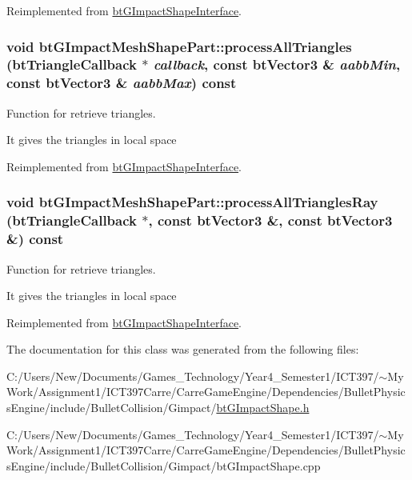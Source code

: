 Reimplemented from \hyperlink{classbt_g_impact_shape_interface_dec0bd43cd0105b1d0dc172bc7db50d8}{btGImpactShapeInterface}.\hypertarget{classbt_g_impact_mesh_shape_part_230a814ad9f784638e8bcbf0592cdd39}{
\subsubsection[processAllTriangles]{\setlength{\rightskip}{0pt plus 5cm}void btGImpactMeshShapePart::processAllTriangles ({\bf btTriangleCallback} $\ast$ {\em callback}, \/  const btVector3 \& {\em aabbMin}, \/  const btVector3 \& {\em aabbMax}) const}}
\label{classbt_g_impact_mesh_shape_part_230a814ad9f784638e8bcbf0592cdd39}


Function for retrieve triangles. 

It gives the triangles in local space 

Reimplemented from \hyperlink{classbt_g_impact_shape_interface_2faf9adce39854a9a66dd658f646be25}{btGImpactShapeInterface}.\hypertarget{classbt_g_impact_mesh_shape_part_0e35b55bd50911911f8164cf3a2dd5c8}{
\subsubsection[processAllTrianglesRay]{\setlength{\rightskip}{0pt plus 5cm}void btGImpactMeshShapePart::processAllTrianglesRay ({\bf btTriangleCallback} $\ast$, \/  const btVector3 \&, \/  const btVector3 \&) const}}
\label{classbt_g_impact_mesh_shape_part_0e35b55bd50911911f8164cf3a2dd5c8}


Function for retrieve triangles. 

It gives the triangles in local space 

Reimplemented from \hyperlink{classbt_g_impact_shape_interface_646ad13b4aa116d58df110c2f407e5a8}{btGImpactShapeInterface}.

The documentation for this class was generated from the following files:\begin{CompactItemize}
\item 
C:/Users/New/Documents/Games\_\-Technology/Year4\_\-Semester1/ICT397/$\sim$My Work/Assignment1/ICT397Carre/CarreGameEngine/Dependencies/BulletPhysicsEngine/include/BulletCollision/Gimpact/\hyperlink{bt_g_impact_shape_8h}{btGImpactShape.h}\item 
C:/Users/New/Documents/Games\_\-Technology/Year4\_\-Semester1/ICT397/$\sim$My Work/Assignment1/ICT397Carre/CarreGameEngine/Dependencies/BulletPhysicsEngine/include/BulletCollision/Gimpact/btGImpactShape.cpp\end{CompactItemize}
